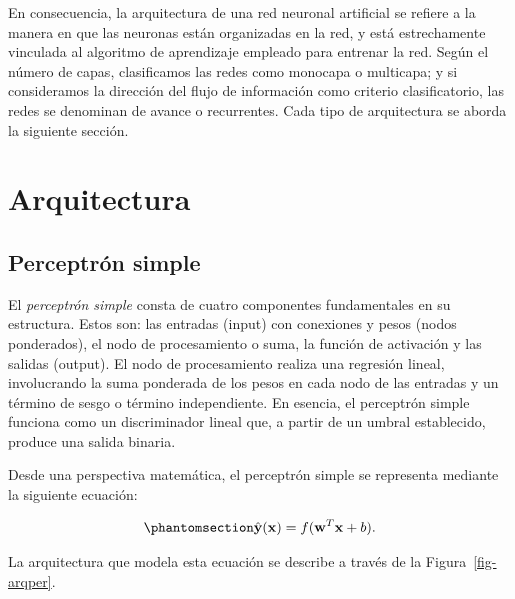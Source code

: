 \documentclass[
  us-letterpaper,
]{scrreprt}
\theoremstyle{plain}
\theoremstyle{definition}
\theoremstyle{plain}
\theoremstyle{definition}
\theoremstyle{remark}
\begin{document}
En consecuencia, la arquitectura de una red neuronal artificial se
refiere a la manera en que las neuronas están organizadas en la red, y
está estrechamente vinculada al algoritmo de aprendizaje empleado para
entrenar la red. Según el número de capas, clasificamos las redes como
monocapa o multicapa; y si consideramos la dirección del flujo de
información como criterio clasificatorio, las redes se denominan de
avance o recurrentes. Cada tipo de arquitectura se aborda la siguiente
sección.

\section{Arquitectura}\label{arquitectura}

\subsection{Perceptrón simple}\label{perceptruxf3n-simple}

El \emph{perceptrón simple} consta de cuatro componentes fundamentales
en su estructura. Estos son: las entradas (input) con conexiones y pesos
(nodos ponderados), el nodo de procesamiento o suma, la función de
activación y las salidas (output). El nodo de procesamiento realiza una
regresión lineal, involucrando la suma ponderada de los pesos en cada
nodo de las entradas y un término de sesgo o término independiente. En
esencia, el perceptrón simple funciona como un discriminador lineal que,
a partir de un umbral establecido, produce una salida binaria.

Desde una perspectiva matemática, el perceptrón simple se representa
mediante la siguiente ecuación:

\begin{equation}\phantomsection\label{eq-perceptron}{
\hat{\mathbf{y}}(\mathbf x)=f(\mathbf w^T\mathbf x+b).
}\end{equation}

La arquitectura que modela esta ecuación se describe a través de la
Figura~\ref{fig-arqper}.
\end{document}
